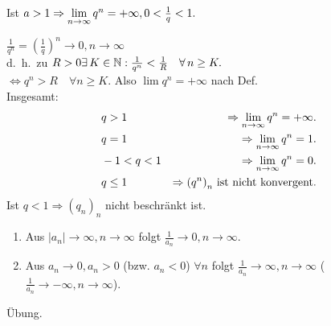 \documentclass[../ana1.tex]{subfiles}
\begin{document}
\begin{bsp}
	Ist \(a>1 \Rightarrow \lim\limits_{n\rightarrow\infty}q^n = +\infty, 0< \frac{1}{q} < 1. \)
\end{bsp}
\begin{bew}
	\( \frac{1}{q^n} = {\left( \frac{1}{q} \right)}^n \rightarrow 0, n\rightarrow \infty \) \\
	d.\ h.\ zu \(R>0 \exists K\in\N: \frac{1}{q^n} < \frac{1}{R} \quad \forall n\geq K. \) \\
	\( \Leftrightarrow q^n > R \quad \forall n\geq K. \) Also \(\lim q^n = +\infty \) nach Def.\\
	Insgesamt: 
	\begin{align*}
		&q>1 &\Rightarrow \lim\limits_{n\rightarrow\infty}q^n = +\infty.\\
		&q=1 &\Rightarrow \lim\limits_{n\rightarrow\infty}q^n = 1.\\
		&-1<q<1 & \Rightarrow \lim\limits_{n\rightarrow\infty} q^n = 0.\\
		&q\leq 1 & \Rightarrow {(q^n)}_n \text{ ist nicht konvergent.}
	\end{align*}
	Ist \( q<1 \Rightarrow {(q_n)}_n \) nicht beschränkt ist.
\end{bew}

\begin{satz}[Kehrwerte]\leavevmode
	\begin{enumerate}
		\item Aus \( |a_n| \rightarrow \infty, n\rightarrow\infty \) folgt \(\frac{1}{a_n} \rightarrow0,n\rightarrow\infty \).
		\item Aus \( a_n\rightarrow 0, a_n > 0 \) (bzw. \(a_n<0\)) \( \forall n \) folgt \( \frac{1}{a_n} \rightarrow\infty, n\rightarrow\infty \) (\( \frac{1}{a_n} \rightarrow -\infty, n\rightarrow\infty \)).
	\end{enumerate}
\end{satz}
\begin{bew}
	Übung.\phantom{\qedhere}
\end{bew}
\end{document}
